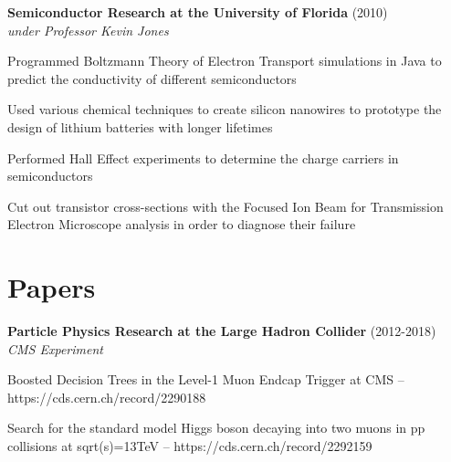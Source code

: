 \begin{resume}
    
    {\bf Semiconductor Research at the University of Florida} (2010)\\\vspace{2mm}%
    \textit{under Professor Kevin Jones}
    \begin{stuff}
        \vspace*{1mm}
                \item Programmed Boltzmann Theory of Electron Transport simulations in Java to predict the conductivity of different semiconductors
	        \item Used various chemical techniques to create silicon nanowires to prototype the design of lithium batteries with longer lifetimes
	        \item Performed Hall Effect experiments to determine the charge carriers in semiconductors
	        \item Cut out transistor cross-sections with the Focused Ion Beam for Transmission Electron Microscope analysis in order to diagnose their failure
				
    \end{stuff}

    {\null}
    \section{\mysidestyle Papers}
    {\bf Particle Physics Research at the Large Hadron Collider} (2012-2018)\\\vspace{2mm}%
    \textit{CMS Experiment}
    \begin{stuff}
        \vspace*{1mm}
                \item Boosted Decision Trees in the Level-1 Muon Endcap Trigger at CMS -- \\\relax https://cds.cern.ch/record/2290188
                \item Search for the standard model Higgs boson decaying into two muons in pp collisions at sqrt(s)=13TeV -- https://cds.cern.ch/record/2292159
    \end{stuff}


\end{resume}
